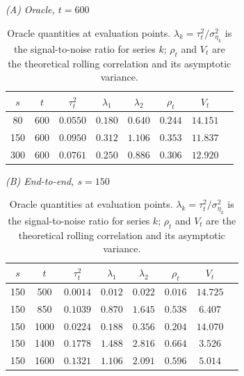 \begin{table}[ht]
\centering
\caption{Oracle quantities at evaluation points. $\lambda_k = \tau^2_t /
  \sigma^2_{\eta_k}$ is the signal-to-noise ratio for series $k$; $\rho_t$
  and $V_t$ are the theoretical rolling correlation and its asymptotic
  variance.}
\label{tab:oracle-quantities}

\textit{(A) Oracle, $t = 600$}

\smallskip
\begin{tabular}{cccccccc}
  \toprule
  $s$ & $t$ & $\tau^2_t$ & $\lambda_1$ & $\lambda_2$ & $\rho_t$ & $V_t$ \\
  \midrule
   80 & 600 & $0.0550$ & $0.180$ & $0.640$ & $0.244$ & $14.151$ \\
  150 & 600 & $0.0950$ & $0.312$ & $1.106$ & $0.353$ & $11.837$ \\
  300 & 600 & $0.0761$ & $0.250$ & $0.886$ & $0.306$ & $12.920$ \\
  \bottomrule
\end{tabular}

\bigskip

\textit{(B) End-to-end, $s = 150$}

\smallskip
\begin{tabular}{cccccccc}
  \toprule
  $s$ & $t$ & $\tau^2_t$ & $\lambda_1$ & $\lambda_2$ & $\rho_t$ & $V_t$ \\
  \midrule
  150 &  500 & $0.0014$ & $0.012$ & $0.022$ & $0.016$ & $14.725$ \\
  150 &  850 & $0.1039$ & $0.870$ & $1.645$ & $0.538$ & $ 6.407$ \\
  150 & 1000 & $0.0224$ & $0.188$ & $0.356$ & $0.204$ & $14.070$ \\
  150 & 1400 & $0.1778$ & $1.488$ & $2.816$ & $0.664$ & $ 3.526$ \\
  150 & 1600 & $0.1321$ & $1.106$ & $2.091$ & $0.596$ & $ 5.014$ \\
  \bottomrule
\end{tabular}

\end{table}
